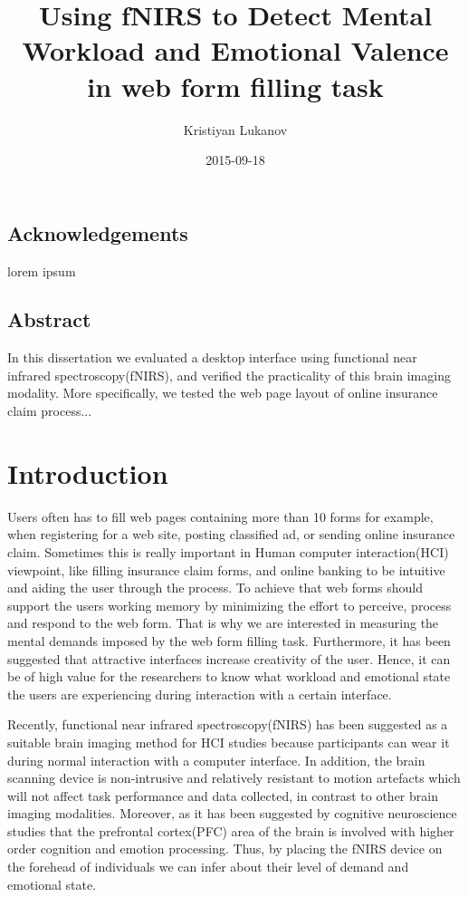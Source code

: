 \documentclass[a4paper]{report}
\title{Using fNIRS to Detect Mental Workload and Emotional Valence in web form filling task}%
\date{2015-09-18}
\author{Kristiyan Lukanov}
\begin{document}
\maketitle
\newpage
{}

\section*{Acknowledgements}
lorem ipsum 
\newpage
	
\section*{Abstract}
In this dissertation we evaluated a desktop interface using functional near infrared spectroscopy(fNIRS), and verified the practicality of this brain imaging modality. More specifically, we tested the web page layout of online insurance claim process...
\newpage
\tableofcontents
\newpage
	
\chapter{Introduction}

	Users often has to fill web pages containing more than 10 forms for example, when registering for a web site, posting classified ad, or sending online insurance claim. Sometimes this is really important in Human computer interaction(HCI) viewpoint, like filling insurance claim forms, and online banking to be intuitive and aiding the user through the process. To achieve that web forms should support the users working memory\cite{nielsen1990heuristic,shneiderman1992designing} by minimizing the effort to perceive, process and respond to the web form. That is why we are interested in measuring the mental demands imposed by the web form filling task. Furthermore, it has been suggested that attractive interfaces increase creativity\cite{norman2002emotion} of the user. Hence, it can be of high value for the researchers to know what workload and emotional state the users are experiencing during interaction with a certain interface.
	
	Recently, functional near infrared spectroscopy(fNIRS) has been suggested as a suitable brain imaging method for HCI studies\cite{maior2015examining,solovey2009using,pike2014measuring} because participants can wear it during normal interaction with a computer interface. In addition, the brain scanning device is non-intrusive and relatively resistant to motion artefacts which will not affect task performance and data collected, in contrast to other brain imaging modalities. Moreover, as it has been suggested by cognitive neuroscience studies that the prefrontal cortex(PFC) area of the brain is involved with higher order cognition\cite{braver1997parametric} and emotion processing\cite{damasio1996somatic}. Thus, by placing the fNIRS device on the forehead of individuals we can infer about their level of demand and emotional state.
	
\end{document}
